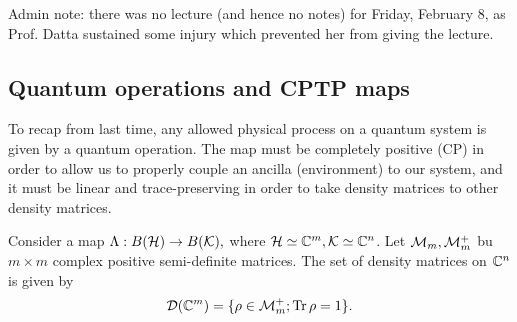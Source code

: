 Admin note: there was no lecture (and hence no notes) for Friday, February 8, as Prof. Datta sustained some injury which prevented her from giving the lecture.

\subsection*{Quantum operations and CPTP maps}
To recap from last time, any allowed physical process on a quantum system is given by a quantum operation. The map must be completely positive (CP) in order to allow us to properly couple an ancilla (environment) to our system, and it must be linear and trace-preserving in order to take density matrices to other density matrices.

Consider a map $\Lambda:B(\mathcal H)\to B(\mathcal{K}),$ where $\mathcal H\simeq \mathbb{C}^m,\mathcal{K}\simeq \mathbb{C}^n$. Let $\mathcal{M}_m, \mathcal{M}_m^+$ bu $m\times m$ complex positive semi-definite matrices. The set of density matrices on $\mathbb{C}^n$ is given by
\begin{equation}
    \mathcal{D}(\mathbb{C}^m)=\{\rho \in \mathcal{M}_m^+; \operatorname{Tr} \rho = 1\}.
\end{equation}


